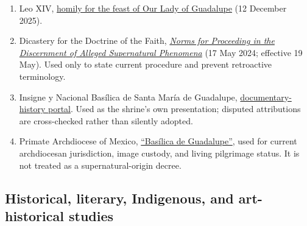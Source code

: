 \begin{enumerate}
  \item Leo XIV, \href{https://www.vatican.va/content/leo-xiv/en/homilies/2025/documents/20251212-messa-guadalupe.html}{homily for the feast of Our Lady of Guadalupe} (12 December 2025).

  \item Dicastery for the Doctrine of the Faith, \href{https://www.vatican.va/roman_curia/congregations/cfaith/documents/rc_ddf_doc_20240517_norme-fenomeni-soprannaturali_en.html}{\emph{Norms for Proceeding in the Discernment of Alleged Supernatural Phenomena}} (17 May 2024; effective 19 May). Used only to state current procedure and prevent retroactive terminology.

  \item Insigne y Nacional Basílica de Santa María de Guadalupe, \href{https://virgendeguadalupe.org.mx/documentos-historicos/}{documentary-history portal}. Used as the shrine's own presentation; disputed attributions are cross-checked rather than silently adopted.

  \item Primate Archdiocese of Mexico, \href{https://arquidiocesismexico.org.mx/basilica-de-guadalupe/}{“Basílica de Guadalupe”}, used for current archdiocesan jurisdiction, image custody, and living pilgrimage status. It is not treated as a supernatural-origin decree.
\end{enumerate}

\subsection{Historical, literary, Indigenous, and art-historical studies}


